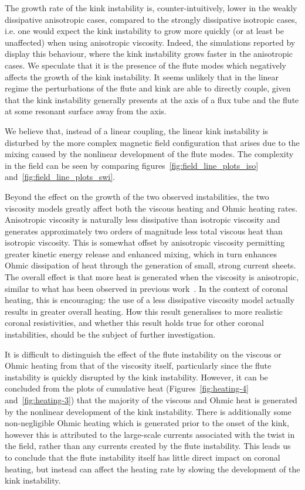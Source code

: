 \documentclass[fleqn,usenatbib]{mnras}
\newcommand{\rev}[1]{{\color{red} {#1}}}
\newcommand{\newold}[2]{{#1}{}}
\begin{document}
\rev{The growth rate of the kink instability is, counter-intuitively, lower in the
weakly dissipative anisotropic cases, compared to the strongly dissipative
isotropic cases, i.e. one would expect the kink instability to grow more
quickly (or at least be unaffected) when using anisotropic viscosity. Indeed,
the simulations reported by~\citet{quinnEffectAnisotropicViscosity2020} display
this behaviour, where the kink instability grows \newold{}{(marginally)} faster in the
anisotropic cases. We speculate that it is the presence of the flute modes which
negatively affects the growth of the kink instability.} {It seems unlikely that
in the linear regime the perturbations of the flute and kink are able to
directly couple, given that the kink instability generally presents at the axis
of a flux tube and the flute at some resonant surface away from the
axis.} \rev{We believe that, instead of a linear coupling, the linear kink instability is
disturbed by the more complex magnetic field configuration that arises due to
the mixing caused by the nonlinear development of the flute modes. The
complexity in the field can be seen by comparing
figures~\ref{fig:field_line_plots_iso} and~\ref{fig:field_line_plots_swi}.

Beyond the effect on the growth of the two observed instabilities, the two
viscosity models greatly affect both the viscous heating and Ohmic heating
rates. Anisotropic viscosity is naturally less dissipative than isotropic
viscosity and generates approximately two orders of magnitude less total
viscous heat than isotropic viscosity. This is somewhat offset by anisotropic
viscosity permitting greater kinetic energy release and enhanced mixing, which
in turn enhances Ohmic dissipation of heat through the generation of small,
strong current sheets. The overall effect is that more heat is generated when
the viscosity is anisotropic, similar to what has been observed in previous
work~\citep{quinnEffectAnisotropicViscosity2020}. In the context of
coronal heating, this is encouraging: the use of a less dissipative viscosity
model actually results in greater overall heating. How this result generalises
to more realistic coronal resistivities, and whether this result holds true for
other coronal instabilities, should be the subject of further investigation.}

\rev{It is difficult to distinguish the effect of the flute instability on the viscous or Ohmic heating from that of the viscosity itself, particularly since the flute instability is quickly disrupted by the kink instability. However, it can be concluded from the plots of cumulative heat (Figures~\ref{fig:heating-4} and~\ref{fig:heating-3}) that the majority of the viscous and Ohmic heat is generated by the nonlinear development of the kink instability. There is additionally some non-negligible Ohmic heating which is generated prior to the onset of the kink, however this is attributed to the large-scale currents associated with the twist in the field, rather than any currents created by the flute instability. This leads us to conclude that the flute instability itself has little direct impact on coronal heating, but instead can affect the heating rate by slowing the development of the kink instability.}
\end{document}
